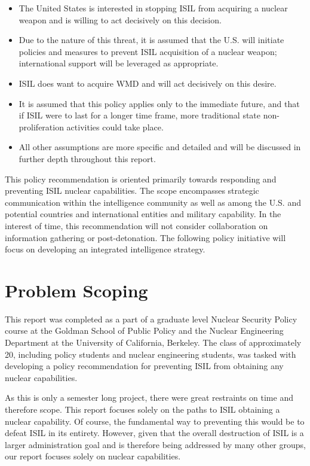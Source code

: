 \documentclass{report}
\begin{document}
\begin{itemize}
  \item The United States is interested in stopping ISIL from acquiring a nuclear weapon and is willing to act decisively on this decision.
  \item Due to the nature of this threat, it is assumed that the U.S. will initiate policies and measures to prevent ISIL acquisition of a nuclear weapon; international support will be leveraged as appropriate.
  \item ISIL does want to acquire WMD and will act decisively on this desire.
  \item It is assumed that this policy applies only to the immediate future, and that if ISIL were to last for a longer time frame, more traditional state non-proliferation activities could take place.
  \item All other assumptions are more specific and detailed and will be discussed in further depth throughout this report.
\end{itemize}



This policy recommendation is oriented primarily towards responding and preventing ISIL nuclear capabilities. The scope encompasses strategic communication within the intelligence community as well as among the U.S. and potential countries and international entities and military capability. In the interest of time, this recommendation will not consider collaboration on information gathering or post-detonation. The following policy initiative will focus on developing an integrated intelligence strategy. 

\section{Problem Scoping}

This report was completed as a part of a graduate level Nuclear Security Policy course at the Goldman School of Public Policy and the Nuclear Engineering Department at the University of California, Berkeley. The class of approximately 20, including policy students and nuclear engineering students, was tasked with developing a policy recommendation for preventing ISIL from obtaining any nuclear capabilities.

As this is only a semester long project, there were great restraints on time and therefore scope. This report focuses solely on the paths to ISIL obtaining a nuclear capability. Of course, the fundamental way to preventing this would be to defeat ISIL in its entirety. However, given that the overall destruction of ISIL is a larger administration goal and is therefore being addressed by many other groups, our report focuses solely on nuclear capabilities. 
\end{document}

